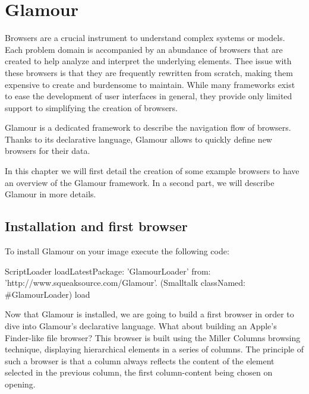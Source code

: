 \documentclass[a4paper,10pt,twoside]{book}
\begin{document}
\fi
\sloppy
\chapter{Glamour}

Browsers are a crucial instrument to understand complex systems or
models. Each problem domain is accompanied by an abundance of browsers
that are created to help analyze and interpret the underlying
elements. Thee issue with these browsers is that they are frequently
rewritten from scratch, making them expensive to create and burdensome
to maintain. While many frameworks exist to ease the development of
user interfaces in general, they provide only limited support to
simplifying the creation of browsers.

Glamour is a dedicated framework to describe the navigation flow
of browsers. Thanks to its declarative language, Glamour allows to
quickly define new browsers for their data.

In this chapter we will first detail the creation of some example
browsers to have an overview of the Glamour framework. In a second
part, we will describe Glamour in more details.

\section{Installation and first browser}

To install Glamour on your \pharo{} image execute the following code:

\begin{code}{}
ScriptLoader
  loadLatestPackage: 'GlamourLoader'
  from: 'http://www.squeaksource.com/Glamour'.
(Smalltalk classNamed: #GlamourLoader) load
\end{code}

Now that Glamour is installed, we are going to build a first browser
in order to dive into Glamour's declarative language. What about
building an Apple's Finder-like file browser? This browser is built
using the Miller Columns browsing technique, displaying hierarchical
elements in a series of columns. The principle of such a browser is
that a column always reflects the content of the element selected in
the previous column, the first column-content being chosen on opening.

\end{document}
